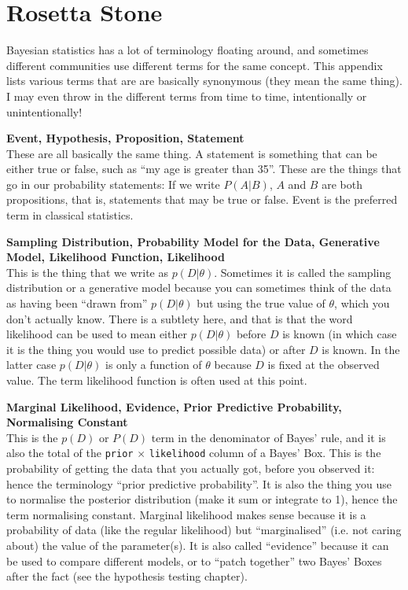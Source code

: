 \chapter{Rosetta Stone}
Bayesian statistics has a lot of terminology floating around, and sometimes
different communities use different terms for the same concept. This appendix
lists various terms that are are basically synonymous (they mean the same thing).
I may even throw in the different terms from time to time, intentionally or
unintentionally!

{\bf Event, Hypothesis, Proposition, Statement}\\
These are all basically the same thing.
A statement is something that can be either true or false, such as ``my age is
greater than 35''. These are the things that go in our
probability statements: If we write $P(A|B)$, $A$ and $B$ are both propositions,
that is, statements that may be true or false. Event is the preferred term in
classical statistics.

{\bf Sampling Distribution, Probability Model for the Data, 
Generative Model, Likelihood Function, Likelihood}\\
This is the thing that we
write as $p(D|\theta)$. Sometimes it is called the sampling distribution or
a generative model because
you can sometimes think of the data as having been ``drawn from''
$p(D|\theta)$ but using the true value of $\theta$, which you don't actually
know. There is a subtlety here, and that is that the word likelihood can be
used to mean either $p(D|\theta)$ before $D$ is known (in which case it is the
thing you would use to predict possible data) or after $D$ is known. In the latter
case $p(D|\theta)$ is only a function of $\theta$ because $D$ is fixed at the
observed value. The term likelihood function is often used at this point.

{\bf Marginal Likelihood, Evidence, Prior Predictive Probability, Normalising
Constant}\\ This is the $p(D)$ or $P(D)$ term in the denominator of Bayes' rule,
and it is also the total of the {\tt prior} $\times$ {\tt likelihood} column
of a Bayes' Box. This is the probability of getting the data that you actually got,
before you observed it: hence the terminology ``prior predictive probability''.
It is also the thing you use to normalise the posterior distribution (make it sum
or integrate to 1), hence the term normalising constant. Marginal likelihood makes
sense because it is a probability of data (like the regular likelihood) but
``marginalised'' (i.e. not caring about) the value of the parameter(s). It is
also called ``evidence'' because it can be used to compare different models, or
to ``patch together'' two Bayes' Boxes after the fact (see the hypothesis testing
chapter).

